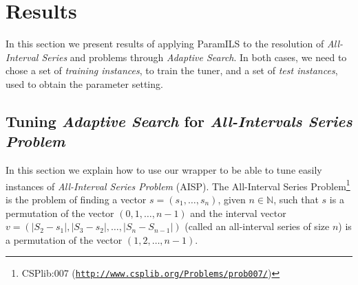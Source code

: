 %
%
%
%
%
%
%

\section{Results}

In this section we present results of applying {\sc ParamILS} to the resolution of {\it All-Interval Series} and \carr{} problems through {\it Adaptive Search}. In both cases, we need to chose a set of {\it training instances}, to train the tuner, and a set of {\it test instances}, used to obtain the parameter setting. 

\subsection{ Tuning {\it Adaptive Search} for  {\it All-Intervals Series Problem}}

In this section we explain how to use our wrapper to be able to tune easily instances of {\it All-Interval Series Problem} (AISP). The All-Interval Series Problem\footnote{CSPlib:007 (\href{http://www.csplib.org/Problems/prob007/}{\texttt{http://www.csplib.org/Problems/prob007/}})} is the problem of finding a vector $s=\left(s_1,\dots,s_n\right)$, given $n \in \mathbb{N}$, such that $s$ is a permutation of the vector $(0, 1, \dots, n-1)$ and the interval vector $v = \left(\left|S_2-s_1\right|, \left|S_3-s_2\right|, \dots, \left|S_n-S_{n-1}\right|\right)$ (called an all-interval series of size $n$) is a permutation of the vector $(1, 2, \dots, n-1)$. 

